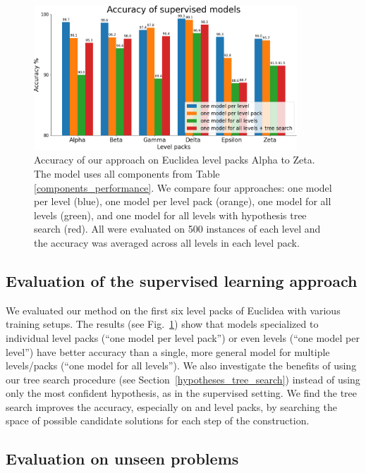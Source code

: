\begin{figure}[!htb]
    \centering
    \includegraphics[width=0.88\textwidth]{img/acc_barplot_with_t_search.png}
    \caption{Accuracy of our approach on Euclidea level packs Alpha to Zeta.
    The model uses all components from Table \ref{components_performance}.
    We compare four approaches: one model per level (blue), one model per level pack (orange), one model for all levels (green), and one model for all levels with hypothesis tree search (red). All were evaluated on 500 instances of each level and the accuracy was averaged across all levels in each level pack.
    }
    \label{final_results}
    \vspace{-2em}
\end{figure}
\subsection{Evaluation of the supervised learning approach}

We evaluated our method on the first six level packs of Euclidea with various training setups. The results (see Fig.~\ref{final_results}) show that models specialized to individual level packs (``one model per level pack'') or even levels (``one model per level'') have better accuracy than a single, more general model for multiple levels/packs (``one model for all levels''). We also investigate the benefits of using our tree search procedure (see Section~\ref{hypotheses_tree_search}) instead of using only the most confident hypothesis, as in the supervised setting. We find the tree search improves the accuracy, especially on \alphapack and \gammapack level packs, by searching the space of possible candidate solutions for each step of the construction.
\subsection{Evaluation on unseen problems}

